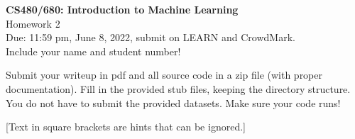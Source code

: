 \documentclass[10pt,letter,notitlepage]{article}
\begin{document}
\begin{center}
\large{\textbf{CS480/680: Introduction to Machine Learning} \\ Homework 2\\ Due: 11:59 pm, June 8, 2022, submit on LEARN and CrowdMark.} \\

Include your name and student number!

\end{center}

\begin{center}
Submit your writeup in pdf and all source code in a zip file (with proper documentation). 
Fill in the provided stub files, keeping the directory structure. You do not have to submit the provided datasets.
Make sure your code runs!

[Text in square brackets are hints that can be ignored.]
\end{center}
\end{document}
